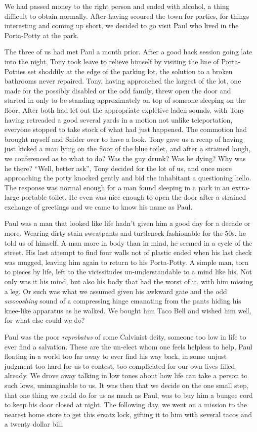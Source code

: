 \documentclass[ebook, 10pt, openright, onecolumn]{memoir}
\begin{document}
We had passed money to the right person and ended with alcohol, a thing
difficult to obtain normally.  After having scoured the town for parties, for
things interesting and coming up short, we decided to go visit Paul who lived in
the Porta-Potty at the park.

The three of us had met Paul a month prior.  After a good hack session going
late into the night, Tony took leave to relieve himself by visiting the line of
Porta-Potties set shoddily at the edge of the parking lot, the solution to a
broken bathrooms never repaired.  Tony, having approached the largest of the
lot, one made for the possibly disabled or the odd family, threw open the door
and started in only to be standing approximately on top of someone sleeping on
the floor.  After both had let out the appropriate expletive laden sounds, with
Tony having retreaded a good several yards in a motion not unlike teleportation,
everyone stopped to take stock of what had just happened.  The commotion had
brought myself and Snider over to have a look.  Tony gave us a recap of having
just kicked a man lying on the floor of the blue toilet, and after a strained
laugh, we conferenced as to what to do?  Was the guy drunk?  Was he dying?  Why
was he there?  ``Well, better ask'', Tony decided for the lot of us, and once
more approaching the potty knocked gently and bid the inhabitant a questioning
hello.  The response was normal enough for a man found sleeping in a park in an
extra-large portable toilet.  He even was nice enough to open the door after a
strained exchange of greetings and we came to know his name as Paul.

Paul was a man that looked like life hadn't given him a good day for a decade or
more.  Wearing dirty stain sweatpants and turtleneck fashionable for the 50s, he
told us of himself.  A man more in body than in mind, he seemed in a cycle of
the street.  His last attempt to find four walls not of plastic ended when his
last check was mugged, leaving him again to return to his Porta-Potty.  A simple
man, torn to pieces by life, left to the vicissitudes un-understandable to a
mind like his. Not only was it his mind, but also his body that had the worst of
it, with him missing a leg. Or such was what we assumed given his awkward gate
and the odd \textit{swoooshing} sound of a compressing hinge emanating from the
pants hiding his knee-like apparatus as he walked.  We bought him Taco Bell and
wished him well, for what else could we do?

Paul was the poor \textit{reprobatus} of some Calvinist deity, someone too low
in life to ever find a salvation.  These are the un-elect whom one feels helpless to
help, Paul floating in a world too far away to ever find his way back, in some unjust
judgment too hard for us to contest, too complicated for our own lives filled
already.  We drove away talking in low tones about how life can take a person to
such lows, unimaginable to us.  It was then that we decide on the one small
step, that one thing we could do for us as much as Paul, was to buy him a bungee
cord to keep his door closed at night.  The following day, we went on a mission
to the nearest home store to get this ersatz lock, gifting it to him with
several tacos and a twenty dollar bill.
\end{document}
